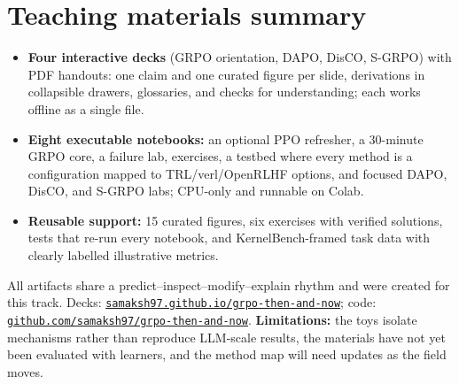\documentclass{article}
\begin{document}
\section{Teaching materials summary}

\begin{itemize}[nosep,leftmargin=1.4em]
  \item \textbf{Four interactive decks} (GRPO orientation, DAPO, DisCO, S-GRPO) with PDF handouts: one claim and one curated figure per slide, derivations in collapsible drawers, glossaries, and checks for understanding; each works offline as a single file.
  \item \textbf{Eight executable notebooks:} an optional PPO refresher, a 30-minute GRPO core, a failure lab, exercises, a testbed where every method is a configuration mapped to TRL/verl/OpenRLHF options, and focused DAPO, DisCO, and S-GRPO labs; CPU-only and runnable on Colab.
  \item \textbf{Reusable support:} 15 curated figures, six exercises with verified solutions, tests that re-run every notebook, and KernelBench-framed task data with clearly labelled illustrative metrics.
\end{itemize}
All artifacts share a predict--inspect--modify--explain rhythm and were created for this track. Decks: \href{https://samaksh97.github.io/grpo-then-and-now}{\nolinkurl{samaksh97.github.io/grpo-then-and-now}}; code: \href{https://github.com/samaksh97/grpo-then-and-now}{\nolinkurl{github.com/samaksh97/grpo-then-and-now}}. \textbf{Limitations:} the toys isolate mechanisms rather than reproduce LLM-scale results, the materials have not yet been evaluated with learners, and the method map will need updates as the field moves.
\end{document}
